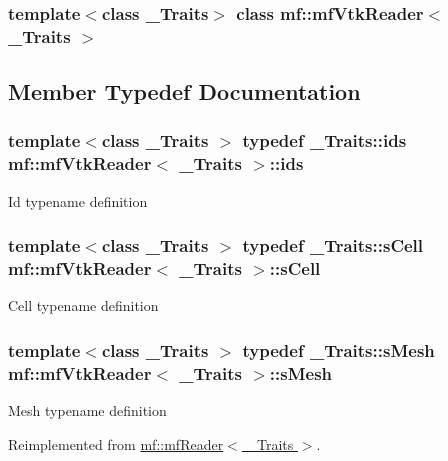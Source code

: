 \subsubsection*{template$<$class \_\-Traits$>$ class mf::mfVtkReader$<$ \_\-Traits $>$}



\subsection{Member Typedef Documentation}
\hypertarget{classmf_1_1mfVtkReader_ad563f3eceaac2a5928f9f2cca98d8a64}{
\subsubsection[{ids}]{\setlength{\rightskip}{0pt plus 5cm}template$<$class \_\-Traits $>$ typedef \_\-Traits::ids {\bf mf::mfVtkReader}$<$ \_\-Traits $>$::{\bf ids}}}
\label{classmf_1_1mfVtkReader_ad563f3eceaac2a5928f9f2cca98d8a64}
Id typename definition \hypertarget{classmf_1_1mfVtkReader_aa5070471f8c7bbc67628f91022ca06c9}{
\subsubsection[{sCell}]{\setlength{\rightskip}{0pt plus 5cm}template$<$class \_\-Traits $>$ typedef \_\-Traits::sCell {\bf mf::mfVtkReader}$<$ \_\-Traits $>$::{\bf sCell}}}
\label{classmf_1_1mfVtkReader_aa5070471f8c7bbc67628f91022ca06c9}
Cell typename definition \hypertarget{classmf_1_1mfVtkReader_a21c487f2b456bef55115cf06620a2f3b}{
\subsubsection[{sMesh}]{\setlength{\rightskip}{0pt plus 5cm}template$<$class \_\-Traits $>$ typedef \_\-Traits::sMesh {\bf mf::mfVtkReader}$<$ \_\-Traits $>$::{\bf sMesh}}}
\label{classmf_1_1mfVtkReader_a21c487f2b456bef55115cf06620a2f3b}
Mesh typename definition 

Reimplemented from \hyperlink{classmf_1_1mfReader}{mf::mfReader$<$ \_\-Traits $>$}.

